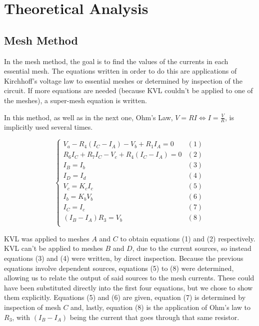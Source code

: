 \section{Theoretical Analysis}
\label{sec:analysis}
\subsection{Mesh Method}

\par
In the mesh method, the goal is to find the values of the currents in each essential mesh. The equations written in order to do this are applications of Kirchhoff's voltage law to essential meshes or determined by inspection of the circuit. If more equations are needed (because KVL couldn't be applied to one of the meshes), a super-mesh equation is written.
\par
In this method, as well as in the next one, Ohm's Law, $V=RI \Leftrightarrow I = \frac{V}{R}$, is implicitly used several times.


\begin{equation}
  \begin{cases}
    V_a - R_4 (I_C-I_A) - V_b + R_1 I_A = 0 & \mbox{$(1)$}\\
    R_6 I_C + R_7 I_C - V_c + R_4(I_C-I_A) = 0 & \mbox{$(2)$}\\
    I_B = I_b & \mbox{$(3)$}\\
    I_D = I_d & \mbox{$(4)$}\\
    V_c = K_c I_c & \mbox{$(5)$} \\
    I_b = K_b V_b & \mbox{$(6)$} \\
    I_C = I_c & \mbox{$(7)$}\\
    (I_B-I_A) R_3 = V_b & \mbox{$(8)$}\\
  \end{cases}
\end{equation}

\par
KVL was applied to meshes $A$ and $C$ to obtain equations (1) and (2) respectively. KVL can't be applied to meshes $B$ and $D$, due to the current sources, so instead equations (3) and (4) were written, by direct inspection. Because the previous equations involve dependent sources, equations (5) to (8) were determined, allowing us to relate the output of said sources to the mesh currents. These could have been substituted directly into the first four equations, but we chose to show them explicitly. Equations (5) and (6) are given, equation (7) is determined by inspection of mesh $C$ and, lastly, equation (8) is the application of Ohm's law to $R_3$, with $(I_B-I_A)$ being the current that goes through that same resistor.

